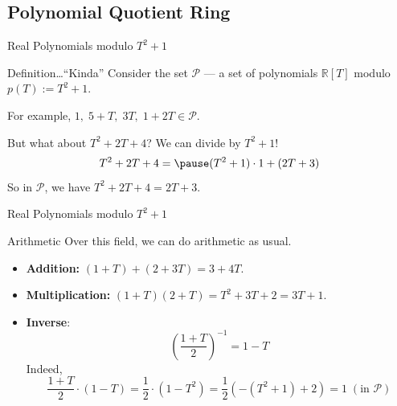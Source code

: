 \documentclass{zkdl-presentation-template}
\begin{document}
    \subsection{Polynomial Quotient Ring}
    \begin{frame}{Real Polynomials modulo $T^2+1$}
        \begin{block}{Definition\ldots ``Kinda''}
            Consider the set $\mathcal{P}$ --- a set of polynomials $\mathbb{R}[T]$ modulo $p(T) := T^2+1$.\pause
        \end{block}

        \begin{example}
            For example, $1,\;5+T,\;3T,\;1+2T \in \mathcal{P}$. \pause
            \vspace{7.5px}

            But what about $T^2+2T+4$? We can divide by $T^2+1$!
            \begin{equation*}
                T^2+2T+4 = \pause (T^2+1)\cdot 1 + (2T+3)
            \end{equation*}
            So in $\mathcal{P}$, we have $T^2+2T+4=2T+3$.
        \end{example}
    \end{frame}

    \begin{frame}{Real Polynomials modulo $T^2+1$}
        \begin{block}{Arithmetic}
            Over this field, we can do arithmetic as usual.
            \begin{itemize}
                \item \textbf{Addition:} $(1+T)+(2+3T)=3+4T$.\pause
                \item \textbf{Multiplication:} $(1+T)(2+T)=T^2+3T+2=3T+1$.\pause
                \item \textbf{Inverse}:
                \begin{equation*}
                    \left(\frac{1+T}{2}\right)^{-1} = 1-T
                \end{equation*}
                \pause Indeed,
                \begin{equation*}
                    \frac{1+T}{2} \cdot (1-T) = \frac{1}{2}\cdot (1-T^2) = \frac{1}{2}\left(-(T^2+1) + 2\right) = 1 \; (\text{in $\mathcal{P}$})
                \end{equation*}
            \end{itemize}
        \end{block}
    \end{frame}
\end{document}
